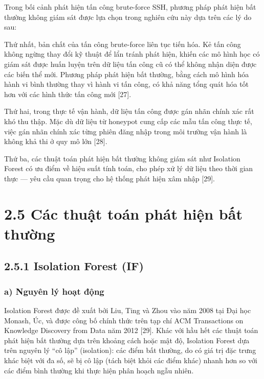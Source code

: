 \documentclass[
  a4paper]{report}
\begin{document}
Trong bối cảnh phát hiện tấn công brute-force SSH, phương pháp phát hiện
bất thường không giám sát được lựa chọn trong nghiên cứu này dựa trên
các lý do sau:

Thứ nhất, bản chất của tấn công brute-force liên tục tiến hóa. Kẻ tấn
công không ngừng thay đổi kỹ thuật để lẩn tránh phát hiện, khiến các mô
hình học có giám sát được huấn luyện trên dữ liệu tấn công cũ có thể
không nhận diện được các biến thể mới. Phương pháp phát hiện bất thường,
bằng cách mô hình hóa hành vi bình thường thay vì hành vi tấn công, có
khả năng tổng quát hóa tốt hơn với các hình thức tấn công mới {[}27{]}.

Thứ hai, trong thực tế vận hành, dữ liệu tấn công được gán nhãn chính
xác rất khó thu thập. Mặc dù dữ liệu từ honeypot cung cấp các mẫu tấn
công thực tế, việc gán nhãn chính xác từng phiên đăng nhập trong môi
trường vận hành là không khả thi ở quy mô lớn {[}28{]}.

Thứ ba, các thuật toán phát hiện bất thường không giám sát như Isolation
Forest có ưu điểm về hiệu suất tính toán, cho phép xử lý dữ liệu theo
thời gian thực --- yêu cầu quan trọng cho hệ thống phát hiện xâm nhập
{[}29{]}.

\section{2.5 Các thuật toán phát hiện bất
thường}\label{cuxe1c-thuux1eadt-touxe1n-phuxe1t-hiux1ec7n-bux1ea5t-thux1b0ux1eddng}

\subsection{2.5.1 Isolation Forest (IF)}\label{isolation-forest-if}

\subsubsection{a) Nguyên lý hoạt
động}\label{a-nguyuxean-luxfd-houx1ea1t-ux111ux1ed9ng}

Isolation Forest được đề xuất bởi Liu, Ting và Zhou vào năm 2008 tại Đại
học Monash, Úc, và được công bố chính thức trên tạp chí ACM Transactions
on Knowledge Discovery from Data năm 2012 {[}29{]}. Khác với hầu hết các
thuật toán phát hiện bất thường dựa trên khoảng cách hoặc mật độ,
Isolation Forest dựa trên nguyên lý ``cô lập'' (isolation): các điểm bất
thường, do có giá trị đặc trưng khác biệt với đa số, sẽ bị cô lập (tách
biệt khỏi các điểm khác) nhanh hơn so với các điểm bình thường khi thực
hiện phân hoạch ngẫu nhiên.
\end{document}
